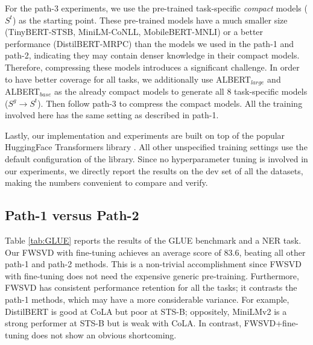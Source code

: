 For the path-3 experiments, we use the pre-trained task-specific \textit{compact} models ($S^t$) as the starting point. These pre-trained models have a much smaller size (TinyBERT-STSB, MiniLM-CoNLL, MobileBERT-MNLI) or a better performance (DistilBERT-MRPC) than the models we used in the path-1 and path-2, indicating they may contain denser knowledge in their compact models. Therefore, compressing these models introduces a significant challenge. In order to have better coverage for all tasks, we additionally use ALBERT$_{large}$ and ALBERT$_{base}$ \citep{lan2019albert} as the already compact models to generate all 8 task-specific models ($S^g \rightarrow S^t$). Then follow path-3 to compress the compact models. All the training involved here has the same setting as described in path-1.

Lastly, our implementation and experiments are built on top of the popular HuggingFace Transformers library \citep{wolf-etal-2020-transformers}. All other unspecified training settings use the default configuration of the library. Since no hyperparameter tuning is involved in our experiments, we directly report the results on the dev set of all the datasets, making the numbers convenient to compare and verify.




\subsection{Path-1 versus Path-2}\label{sec:path1_vs_path2}
Table \ref{tab:GLUE} reports the results of the GLUE benchmark and a NER task. 
Our FWSVD with fine-tuning achieves an average score of $83.6$, beating all other path-1 and path-2 methods.
This is a non-trivial accomplishment since FWSVD with fine-tuning does not need the expensive generic pre-training.
Furthermore, FWSVD has consistent performance retention for all the tasks; it contrasts the path-1 methods, which may have a more considerable variance.
For example, DistilBERT is good at CoLA but poor at STS-B; oppositely,
MiniLMv2 is a strong performer at STS-B but is weak with CoLA. 
In contrast, FWSVD+fine-tuning does not show an obvious shortcoming.


